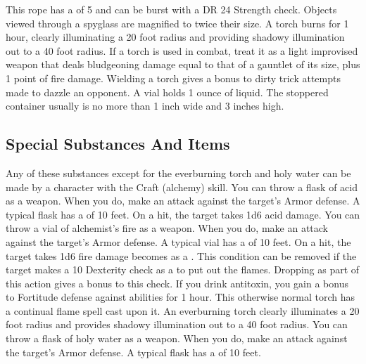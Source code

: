          This rope has a  of 5 and can be burst with a DR 24 Strength check.
         Objects viewed through a spyglass are magnified to twice their size.
         A torch burns for 1 hour, clearly illuminating a 20 foot radius and providing shadowy illumination out to a 40 foot radius. If a torch is used in combat, treat it as a light improvised weapon that deals bludgeoning damage equal to that of a gauntlet of its size, plus 1 point of fire damage. Wielding a torch gives a  bonus to dirty trick attempts made to dazzle an opponent.
         A vial holds 1 ounce of liquid. The stoppered container usually is no more than 1 inch wide and 3 inches high.

    \subsection{Special Substances And Items}
        Any of these substances except for the everburning torch and holy water can be made by a character with the Craft (alchemy) skill.
         You can throw a flask of acid as a weapon.
        When you do, make an attack against the target's Armor defense.
        A typical flask has a  of 10 feet.
        On a hit, the target takes 1d6 acid damage.
         You can throw a vial of alchemist's fire as a weapon.
        When you do, make an attack against the target's Armor defense.
        A typical vial has a  of 10 feet.
        On a hit, the target takes 1d6 fire damage becomes  as a .
        This condition can be removed if the target makes a  10 Dexterity check as a  to put out the flames.
        Dropping  as part of this action gives a  bonus to this check.
         If you drink antitoxin, you gain a  bonus to Fortitude defense against  abilities for 1 hour.
         This otherwise normal torch has a continual flame spell cast upon it. An everburning torch clearly illuminates a 20 foot radius and provides shadowy illumination out to a 40 foot radius.
         You can throw a flask of holy water as a weapon.
        When you do, make an attack against the target's Armor defense.
        A typical flask has a  of 10 feet.
